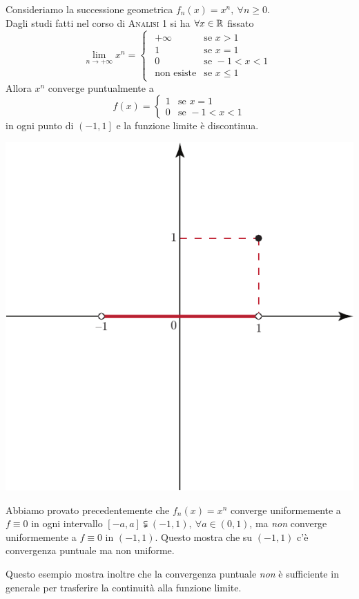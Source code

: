 \begin{examplewt}
	Consideriamo la successione geometrica $f_n(x)=x^n,\ \forall n\geq 0$.\\
	Dagli studi fatti nel corso di \textsc{Analisi 1} si ha $\forall x\in\mathbb{R}$ fissato 
	\begin{equation*}
		\lim_{n\to+\infty}x^n=
		\begin{cases}
			\begin{array}{ll}
				+\infty&\text{se }x>1\\
				1&\text{se }x=1\\
				0&\text{se }-1<x<1\\
				\text{non esiste}&\text{se }x\leq 1
			\end{array}
		\end{cases}
	\end{equation*}
Allora $x^n$ converge puntualmente a
\begin{equation*}
	f(x)=
	\begin{cases}
	1&\text{se }x=1\\
	0&\text{se }-1<x<1	
	\end{cases}
\end{equation*}
in ogni punto di $\left(-1,1\right]$ e la funzione limite è discontinua.
\begin{center}
	\includegraphics[trim=0cm 4cm 0cm 0cm, clip, scale=0.65]{images/grafico4.pdf}
\end{center}
\end{examplewt}
Abbiamo provato precedentemente che $f_n(x)=x^n$ converge uniformemente a $f\equiv 0$ in ogni intervallo $\left[-a,a\right]\subsetneqq\left(-1,1\right),\ \forall a\in\left(0,1\right)$, ma \textit{non} converge uniformemente a $f\equiv0$ in $\left(-1,1\right)$. Questo mostra che su $\left(-1,1\right)$ c'è convergenza puntuale ma non uniforme.
\begin{observe}
	Questo esempio mostra inoltre che la convergenza puntuale \textit{non} è sufficiente in generale per trasferire la continuità alla funzione limite.
\end{observe}
